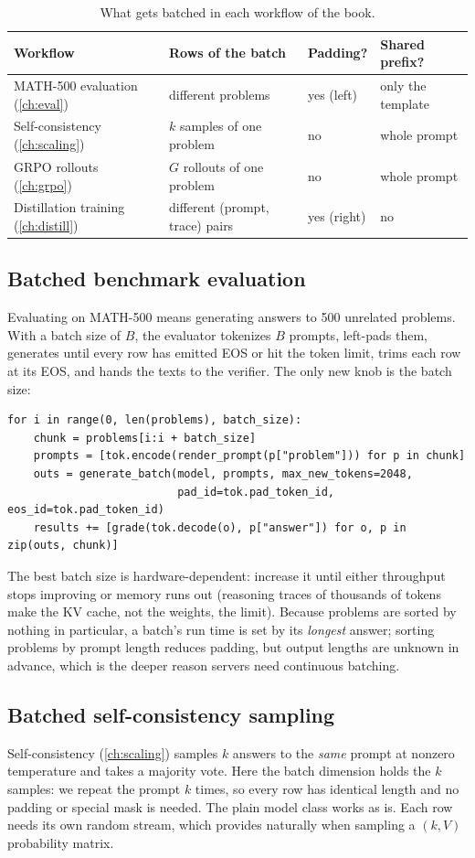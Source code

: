 \begin{table}[ht]
\centering\small
\caption{What gets batched in each workflow of the book.}
\label{tab:serving:workflows}
\begin{tabularx}{\linewidth}{lXll}
\toprule
Workflow & Rows of the batch & Padding? & Shared prefix?\\
\midrule
MATH-500 evaluation (\cref{ch:eval}) & different problems & yes (left) & only the template\\
Self-consistency (\cref{ch:scaling}) & $k$ samples of one problem & no & whole prompt\\
GRPO rollouts (\cref{ch:grpo}) & $G$ rollouts of one problem & no & whole prompt\\
Distillation training (\cref{ch:distill}) & different (prompt, trace) pairs & yes (right) & no\\
\bottomrule
\end{tabularx}
\end{table}

\subsection{Batched benchmark evaluation}
Evaluating on MATH-500 means generating answers to 500 unrelated problems. With a batch size of
$B$, the evaluator tokenizes $B$ prompts, left-pads them, generates until every row has emitted EOS
or hit the token limit, trims each row at its EOS, and hands the texts to the verifier. The only new knob is the batch size:
\begin{lstlisting}
for i in range(0, len(problems), batch_size):
    chunk = problems[i:i + batch_size]
    prompts = [tok.encode(render_prompt(p["problem"])) for p in chunk]
    outs = generate_batch(model, prompts, max_new_tokens=2048,
                          pad_id=tok.pad_token_id, eos_id=tok.pad_token_id)
    results += [grade(tok.decode(o), p["answer"]) for o, p in zip(outs, chunk)]
\end{lstlisting}
The best batch size is hardware-dependent: increase it until either throughput stops improving or
memory runs out (reasoning traces of thousands of tokens make the KV cache, not the weights, the
limit). Because problems are sorted by nothing in particular, a batch's run time is set by its
\emph{longest} answer; sorting problems by prompt length reduces padding, but output lengths are
unknown in advance, which is the deeper reason servers need continuous batching.

\subsection{Batched self-consistency sampling}
Self-consistency (\cref{ch:scaling}) samples $k$ answers to the \emph{same} prompt at nonzero
temperature and takes a majority vote. Here the batch dimension holds the $k$ samples: we repeat the
prompt $k$ times, so every row has identical length and no padding or special mask is needed. The
plain model class works as is. Each row needs its own random stream, which 
provides naturally when sampling a $(k,V)$ probability matrix.

